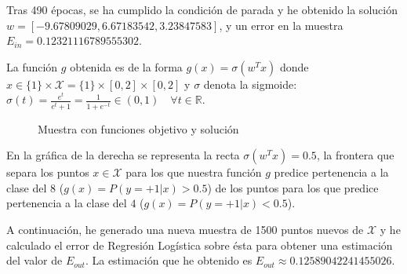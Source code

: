 \documentclass[a4]{article}
\begin{document}
Tras 490 épocas, se ha cumplido la condición de parada y he obtenido
la solución $w= [-9.67809029,  6.67183542, 3.23847583]$, y un error
en la muestra $E_{in}=0.12321116789555302$.

La función $g$ obtenida es de la forma $g(x)=\sigma(w^Tx)$ donde $x\in\{1\}\times\mathcal{X}=\{1\}\times[0,2]\times[0,2]$
y $\sigma$ denota la sigmoide: $\sigma(t)=\frac{e^t}{e^t+1}=\frac{1}{1+e^{-t}}\in (0,1)\quad\forall t\in\mathbb{R}$.

\vspace{-3mm}
\begin{figure}[H]
    \centering
    \caption{Muestra con funciones objetivo y solución}
    \label{fig:lin-regress}
\end{figure}

En la gráfica de la derecha se representa la recta $\sigma(w^Tx)=0.5$,
la frontera que separa los puntos $x\in\mathcal{X}$ para los que nuestra función $g$
predice pertenencia a la clase del $8$ \big($g(x)=P(y=+1|x)>0.5$\big)
de los puntos para los que predice pertenencia a la clase del $4$
\big($g(x)=P(y=+1|x)<0.5$\big).

A continuación, he generado una nueva muestra de 1500 puntos nuevos
de $\mathcal{X}$ y he calculado el error de Regresión Logística
sobre ésta para obtener una estimación del valor de $E_{out}$.
La estimación que he obtenido es $E_{out}\approx 0.12589042241455026$.
\end{document}
